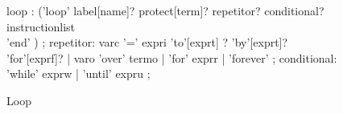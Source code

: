 \begin{figure}[h]
\caption{Loop}
\begin{rail}
loop : ('loop' label[name]? protect[term]?  repetitor? conditional? \\
            instructionlist \\
           'end'     )
                 ;
repetitor: varc '=' expri 'to'[exprt] ? 'by'[exprt]? 'for'[exprf]? |
                varo 'over' termo |
                'for' exprr |
                'forever'
                 ;
conditional: 'while' exprw |
                    'until' expru
                 ;
\end{rail}
\end{figure}
